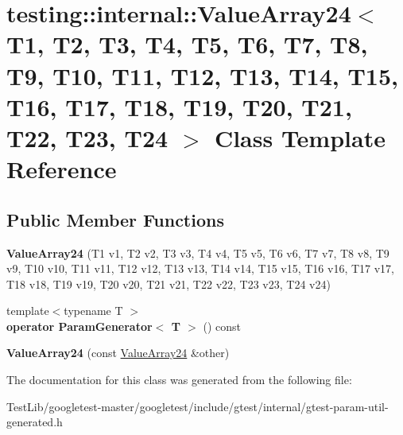\hypertarget{classtesting_1_1internal_1_1ValueArray24}{}\section{testing\+:\+:internal\+:\+:Value\+Array24$<$ T1, T2, T3, T4, T5, T6, T7, T8, T9, T10, T11, T12, T13, T14, T15, T16, T17, T18, T19, T20, T21, T22, T23, T24 $>$ Class Template Reference}
\label{classtesting_1_1internal_1_1ValueArray24}
\subsection*{Public Member Functions}
\begin{DoxyCompactItemize}
\item 
\mbox{\label{classtesting_1_1internal_1_1ValueArray24_abee2a51b2ed37f05ccecf7f2d5f43106}} 
{\bfseries Value\+Array24} (T1 v1, T2 v2, T3 v3, T4 v4, T5 v5, T6 v6, T7 v7, T8 v8, T9 v9, T10 v10, T11 v11, T12 v12, T13 v13, T14 v14, T15 v15, T16 v16, T17 v17, T18 v18, T19 v19, T20 v20, T21 v21, T22 v22, T23 v23, T24 v24)
\item 
\mbox{\label{classtesting_1_1internal_1_1ValueArray24_a6832c33cb80f6e0ff5fd0c557e743442}} 
{\footnotesize template$<$typename T $>$ }\\{\bfseries operator Param\+Generator$<$ T $>$} () const
\item 
\mbox{\label{classtesting_1_1internal_1_1ValueArray24_ae0e1f56f53518702e36b7b425c5513c6}} 
{\bfseries Value\+Array24} (const \hyperlink{classtesting_1_1internal_1_1ValueArray24}{Value\+Array24} \&other)
\end{DoxyCompactItemize}


The documentation for this class was generated from the following file\+:\begin{DoxyCompactItemize}
\item 
Test\+Lib/googletest-\/master/googletest/include/gtest/internal/gtest-\/param-\/util-\/generated.\+h\end{DoxyCompactItemize}
